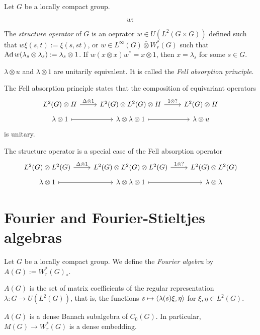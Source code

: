 \documentclass{../../large}
\begin{document}
\begin{prb}
Let $G$ be a locally compact group.

\[w:\]

The \emph{structure operator} of $G$
 is an oeprator $w\in U(L^2(G\times G))$ defined such that $w\xi(s,t):=\xi(s,st)$, or $w\in L^\infty(G)\bar\otimes W_r^*(G)$ such that $\operatorname{Ad} w(\lambda_s\otimes\lambda_s):=\lambda_s\otimes1$.
If $w(x\otimes x)w^*=x\otimes1$, then $x=\lambda_s$ for some $s\in G$.
\begin{parts}
\item $\lambda\otimes u$ and $\lambda\otimes1$ are unitarily equivalent. It is called the \emph{Fell absorption principle}.
\end{parts}
\end{prb}
\begin{pf}

The Fell absorption principle states that the composition of equivariant operators
\[\begin{tikzcd}[row sep=tiny]
L^2(G)\otimes H \rar{\Delta\otimes1} & L^2(G)\otimes L^2(G)\otimes H \rar{1\otimes?} & L^2(G)\otimes H\\
\lambda\otimes 1 \rar[mapsto] & \lambda\otimes\lambda\otimes1 \rar[mapsto] & \lambda\otimes u
\end{tikzcd}\]
is unitary.

The structure operator is a special case of the Fell absorption operator
\[\begin{tikzcd}[row sep=tiny]
L^2(G)\otimes L^2(G) \rar{\Delta\otimes1} & L^2(G)\otimes L^2(G)\otimes L^2(G) \rar{1\otimes?} & L^2(G)\otimes L^2(G)\\
\lambda\otimes1 \rar[mapsto] & \lambda\otimes\lambda\otimes1 \rar[mapsto] & \lambda\otimes\lambda
\end{tikzcd}\]
\end{pf}

\section{Fourier and Fourier-Stieltjes algebras}


\begin{prb}
Let $G$ be a locally compact group.
We define the \emph{Fourier algebra} by $A(G):=W_r^*(G)_*$.
\begin{parts}
\item $A(G)$ is the set of matrix coefficients of the regular representation $\lambda:G\to U(L^2(G))$, that is, the functions $s\mapsto\langle\lambda(s)\xi,\eta\rangle$ for $\xi,\eta\in L^2(G)$.
\item $A(G)$ is a dense Banach subalgebra of $C_0(G)$. In particular, $M(G)\to W_r^*(G)$ is a dense embedding.
\end{parts}
\end{prb}
\begin{pf}

\end{pf}
\end{document}
